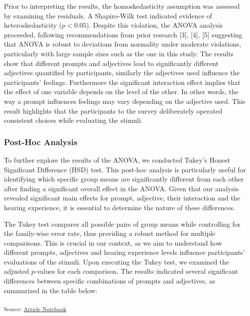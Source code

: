 \documentclass[
  letterpaper,
  DIV=11,
  numbers=noendperiod]{scrartcl}
\begin{document}
Prior to interpreting the results, the homoskedasticity assumption was
assessed by examining the residuals. A Shapiro-Wilk test indicated
evidence of heteroskedasticity (\(p < 0.05\)). Despite this violation,
the ANOVA analysis proceeded, following recommendations from prior
research {[}3{]}, {[}4{]}, {[}5{]} suggesting that ANOVA is robust to
deviations from normality under moderate violations, particularly with
large sample sizes such as the one in this study. The results show that
different prompts and adjectives lead to significantly different
adjectives quantified by participants, similarly the adjectives used
influence the participants' feelings. Furthermore the significant
interaction effect implies that the effect of one variable depends on
the level of the other. In other words, the way a prompt influences
feelings may vary depending on the adjective used. This result
highlights that the participants to the survey deliberately operated
consistent choices while evaluating the stimuli.

\subsubsection{Post-Hoc Analysis}\label{post-hoc-analysis}

To further explore the results of the ANOVA, we conducted Tukey's Honest
Significant Difference (HSD) test. This post-hoc analysis is
particularly useful for identifying which specific group means are
significantly different from each other after finding a significant
overall effect in the ANOVA. Given that our analysis revealed
significant main effects for prompt, adjective, their interaction and
the hearing experience, it is essential to determine the nature of these
differences.

The Tukey test compares all possible pairs of group means while
controlling for the family-wise error rate, thus providing a robust
method for multiple comparisons. This is crucial in our context, as we
aim to understand how different prompts, adjectives and hearing
experience levels influence participants' evaluations of the stimuli.
Upon executing the Tukey test, we examined the adjusted \(p\)-values for
each comparison. The results indicated several significant differences
between specific combinations of prompts and adjectives, as summarized
in the table below:

\textsubscript{Source:
\href{https://matteospanio.github.io/multimodal-symphony-survey-analysis/index.qmd.html}{Article
Notebook}}
\end{document}
